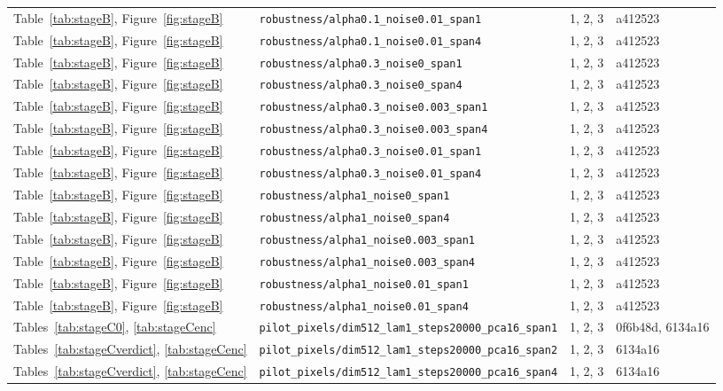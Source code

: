 \begin{longtable}{p{3.6cm}p{6.2cm}p{1.6cm}p{1.6cm}}
Table~\ref{tab:stageB}, Figure~\ref{fig:stageB} & \texttt{robustness/alpha0.1\_noise0.01\_span1} & 1, 2, 3 & a412523\\
Table~\ref{tab:stageB}, Figure~\ref{fig:stageB} & \texttt{robustness/alpha0.1\_noise0.01\_span4} & 1, 2, 3 & a412523\\
Table~\ref{tab:stageB}, Figure~\ref{fig:stageB} & \texttt{robustness/alpha0.3\_noise0\_span1} & 1, 2, 3 & a412523\\
Table~\ref{tab:stageB}, Figure~\ref{fig:stageB} & \texttt{robustness/alpha0.3\_noise0\_span4} & 1, 2, 3 & a412523\\
Table~\ref{tab:stageB}, Figure~\ref{fig:stageB} & \texttt{robustness/alpha0.3\_noise0.003\_span1} & 1, 2, 3 & a412523\\
Table~\ref{tab:stageB}, Figure~\ref{fig:stageB} & \texttt{robustness/alpha0.3\_noise0.003\_span4} & 1, 2, 3 & a412523\\
Table~\ref{tab:stageB}, Figure~\ref{fig:stageB} & \texttt{robustness/alpha0.3\_noise0.01\_span1} & 1, 2, 3 & a412523\\
Table~\ref{tab:stageB}, Figure~\ref{fig:stageB} & \texttt{robustness/alpha0.3\_noise0.01\_span4} & 1, 2, 3 & a412523\\
Table~\ref{tab:stageB}, Figure~\ref{fig:stageB} & \texttt{robustness/alpha1\_noise0\_span1} & 1, 2, 3 & a412523\\
Table~\ref{tab:stageB}, Figure~\ref{fig:stageB} & \texttt{robustness/alpha1\_noise0\_span4} & 1, 2, 3 & a412523\\
Table~\ref{tab:stageB}, Figure~\ref{fig:stageB} & \texttt{robustness/alpha1\_noise0.003\_span1} & 1, 2, 3 & a412523\\
Table~\ref{tab:stageB}, Figure~\ref{fig:stageB} & \texttt{robustness/alpha1\_noise0.003\_span4} & 1, 2, 3 & a412523\\
Table~\ref{tab:stageB}, Figure~\ref{fig:stageB} & \texttt{robustness/alpha1\_noise0.01\_span1} & 1, 2, 3 & a412523\\
Table~\ref{tab:stageB}, Figure~\ref{fig:stageB} & \texttt{robustness/alpha1\_noise0.01\_span4} & 1, 2, 3 & a412523\\
Tables~\ref{tab:stageC0}, \ref{tab:stageCenc} & \texttt{pilot\_pixels/dim512\_lam1\_steps20000\_pca16\_span1} & 1, 2, 3 & 0f6b48d, 6134a16\\
Tables~\ref{tab:stageCverdict}, \ref{tab:stageCenc} & \texttt{pilot\_pixels/dim512\_lam1\_steps20000\_pca16\_span2} & 1, 2, 3 & 6134a16\\
Tables~\ref{tab:stageCverdict}, \ref{tab:stageCenc} & \texttt{pilot\_pixels/dim512\_lam1\_steps20000\_pca16\_span4} & 1, 2, 3 & 6134a16\\

\end{longtable}
